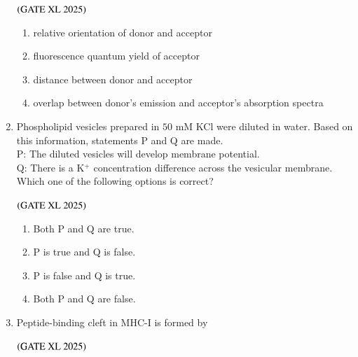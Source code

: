 \documentclass[journal]{IEEEtran}
\begin{document}
\begin{enumerate}
    \hfill $\left(\text{GATE XL 2025}\right)$

    \begin{enumerate}
        \item relative orientation of donor and acceptor
        \item fluorescence quantum yield of acceptor
        \item distance between donor and acceptor
        \item overlap between donor's emission and acceptor's absorption spectra
    \end{enumerate}

    \item Phospholipid vesicles prepared in $50$ mM KCl were diluted in water. Based on this information, statements P and Q are made.\\
    P: The diluted vesicles will develop membrane potential.\\
    Q: There is a K$^+$ concentration difference across the vesicular membrane.\\
    Which one of the following options is correct?

    \hfill $\left(\text{GATE XL 2025}\right)$

    \begin{enumerate}
        \item Both P and Q are true.
        \item P is true and Q is false.
        \item P is false and Q is true.
        \item Both P and Q are false.
    \end{enumerate}

    \item Peptide-binding cleft in MHC-I is formed by

    \hfill $\left(\text{GATE XL 2025}\right)$

    \begin{enumerate}
    \end{enumerate}


\end{enumerate}
\end{document}
